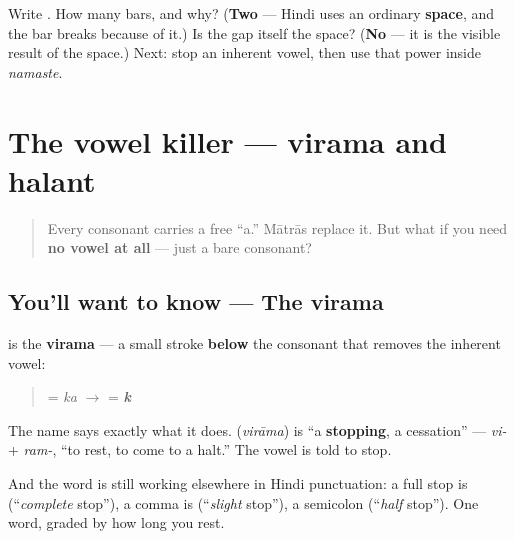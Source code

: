 \begin{tcolorbox}[breakable,colback=teal!4,colframe=teal!35!black,title={Before you move on}]
Write \textbf{ }. How many bars, and why? (\textbf{Two} — Hindi uses an ordinary \textbf{space}, and the bar breaks because of it.) Is the gap itself the space? (\textbf{No} — it is the visible result of the space.) Next: stop an inherent vowel, then use that power inside \emph{namaste}.
\end{tcolorbox}
\section[\texorpdfstring{\hi{्} / \hi{विराम} / \hi{हलंत} (virāma / halant)}{् / विराम / हलंत (virāma / halant)}]{The vowel killer — virama and halant}

\label{lesson:HI-W05-virama-namaste}



\begin{quote}
Every consonant carries a free \textquotedblleft{}a.\textquotedblright{} Mātrās replace it. But what if you need \textbf{no vowel at all} — just a bare consonant?
\end{quote}

\subsection*{You'll want to know — The virama }
\textbf{} is the \textbf{virama} — a small stroke \textbf{below} the consonant that removes the inherent vowel:

\begin{quote}
 = \emph{ka} $\to$  = \emph{\textbf{k}}
\end{quote}

The name says exactly what it does. \textbf{} (\emph{virāma}) is \textquotedblleft{}a \textbf{stopping}, a cessation\textquotedblright{} — \emph{vi-} + \emph{ram-}, \textquotedblleft{}to rest, to come to a halt.\textquotedblright{} The vowel is told to stop.

And the word is still working elsewhere in Hindi punctuation: a full stop is \textbf{ } (\textquotedblleft{}\emph{complete} stop\textquotedblright{}), a comma is \textbf{ } (\textquotedblleft{}\emph{slight} stop\textquotedblright{}), a semicolon \textbf{ } (\textquotedblleft{}\emph{half} stop\textquotedblright{}). One word, graded by how long you rest.

